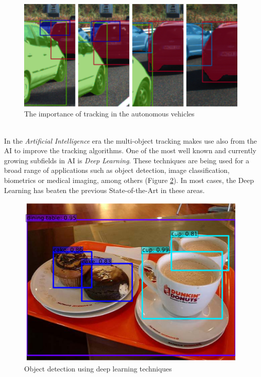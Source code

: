 \begin{figure}[H]
\begin{center}
\includegraphics[scale=0.4]{figures/adas_tracking.png}
\caption{The importance of tracking in the autonomous vehicles \cite{voigtlaender2019mots}}
\label{fig:adas_tracking}
\end{center}
\end{figure}\\
In the \textit{Artificial Intelligence} era the multi-object tracking makes use also from the AI to improve the tracking algorithms. One of the most well known and currently growing subfields in AI is \textit{Deep Learning}. These techniques are being used for a broad range of applications such as object detection, image classification, biometrics or medical imaging, among others (Figure \ref{fig:ssd_detection}). In most cases, the Deep Learning has beaten the previous State-of-the-Art in these areas.
\begin{figure}[H]
\begin{center}
\includegraphics[scale=0.35]{figures/ssd_detection.png}
\caption{Object detection using deep learning techniques \cite{liu2016ssd}}
\label{fig:ssd_detection}
\end{center}
\end{figure}
